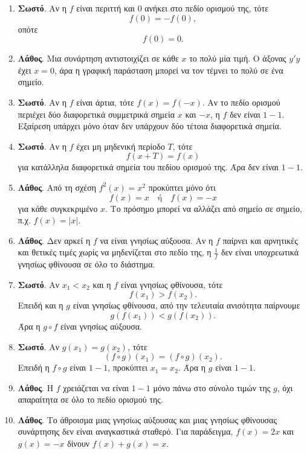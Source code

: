 \begin{enumerate}[label=\textbf{1.\arabic*.}]
\item \textbf{Σωστό}. Αν η $f$ είναι περιττή και $0$ ανήκει στο πεδίο ορισμού της, τότε
\[
f(0)=-f(0),
\]
οπότε
\[
f(0)=0.
\]

\item \textbf{Λάθος}. Μια συνάρτηση αντιστοιχίζει σε κάθε $x$ το πολύ μία τιμή. Ο άξονας $y'y$ έχει $x=0$, άρα η γραφική παράσταση μπορεί να τον τέμνει το πολύ σε ένα σημείο.

\item \textbf{Σωστό}. Αν η $f$ είναι άρτια, τότε $f(x)=f(-x)$. Αν το πεδίο ορισμού περιέχει δύο διαφορετικά συμμετρικά σημεία $x$ και $-x$, η $f$ δεν είναι $1-1$. Εξαίρεση υπάρχει μόνο όταν δεν υπάρχουν δύο τέτοια διαφορετικά σημεία.

\item \textbf{Σωστό}. Αν η $f$ έχει μη μηδενική περίοδο $T$, τότε
\[
f(x+T)=f(x)
\]
για κατάλληλα διαφορετικά σημεία του πεδίου ορισμού της. Άρα δεν είναι $1-1$.

\item \textbf{Λάθος}. Από τη σχέση $f^2(x)=x^2$ προκύπτει μόνο ότι
\[
f(x)=x \quad \text{ή} \quad f(x)=-x
\]
για κάθε συγκεκριμένο $x$. Το πρόσημο μπορεί να αλλάζει από σημείο σε σημείο, π.χ. $f(x)=|x|$.

\item \textbf{Λάθος}. Δεν αρκεί η $f$ να είναι γνησίως αύξουσα. Αν η $f$ παίρνει και αρνητικές και θετικές τιμές χωρίς να μηδενίζεται στο πεδίο της, η $\frac1f$ δεν είναι υποχρεωτικά γνησίως φθίνουσα σε όλο το διάστημα.

\item \textbf{Σωστό}. Αν $x_1<x_2$ και η $f$ είναι γνησίως φθίνουσα, τότε
\[
f(x_1)>f(x_2).
\]
Επειδή και η $g$ είναι γνησίως φθίνουσα, από την τελευταία ανισότητα παίρνουμε
\[
g(f(x_1))<g(f(x_2)).
\]
Άρα η $g\circ f$ είναι γνησίως αύξουσα.

\item \textbf{Σωστό}. Αν $g(x_1)=g(x_2)$, τότε
\[
(f\circ g)(x_1)=(f\circ g)(x_2).
\]
Επειδή η $f\circ g$ είναι $1-1$, προκύπτει $x_1=x_2$. Άρα η $g$ είναι $1-1$.

\item \textbf{Λάθος}. Η $f$ χρειάζεται να είναι $1-1$ μόνο πάνω στο σύνολο τιμών της $g$, όχι απαραίτητα σε όλο το πεδίο ορισμού της.

\item \textbf{Λάθος}. Το άθροισμα μιας γνησίως αύξουσας και μιας γνησίως φθίνουσας συνάρτησης δεν είναι αναγκαστικά σταθερό. Για παράδειγμα, $f(x)=2x$ και $g(x)=-x$ δίνουν $f(x)+g(x)=x$.


\end{enumerate}
